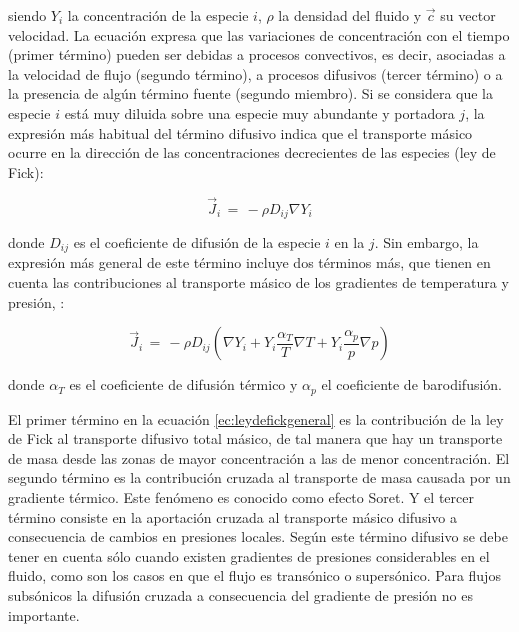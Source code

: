 siendo  $Y_i$ la concentración de la especie $i$,  $\rho$ la densidad del fluido y  $\vec{c}$ su vector velocidad. La ecuación expresa que las variaciones de concentración con el tiempo (primer término) pueden ser debidas a procesos convectivos, es decir, asociadas a la velocidad de flujo (segundo término), a procesos difusivos (tercer término) o a la presencia de algún término fuente (segundo miembro). Si se considera que la especie $i$ está muy diluida sobre una especie muy abundante y portadora $j$, la expresión más habitual del término difusivo indica que el transporte másico ocurre en la dirección de las concentraciones decrecientes de las especies (ley de Fick):

\begin{equation}
\label{ec:leydefick}
\vec{J}_i\,=\,-\rho D_{ij} \nabla Y_i
\end{equation}

donde  $D_{ij}$ es el coeficiente de difusión de la especie $i$ en la $j$. Sin embargo, la expresión más general de este término incluye dos términos más, que tienen en cuenta las contribuciones al transporte másico de los gradientes de temperatura y presión, \cite{landauetal:1987}:

\begin{equation}
\label{ec:leydefickgeneral}
\vec{J}_i\,=\,- \rho D_{ij} \left( \nabla Y_i + Y_i \frac{\alpha_T}{T} \nabla T + Y_i \frac{\alpha_p}{p} \nabla p \right)
\end{equation}

donde  $\alpha_T$ es el  coeficiente de difusión térmico y  $\alpha_p$ el  coeficiente de barodifusión.

\par El primer término en la ecuación \ref{ec:leydefickgeneral} es la contribución de la ley de Fick al transporte difusivo total másico, de tal manera que hay un transporte de masa desde las zonas de mayor concentración a las de menor concentración. El segundo término es la contribución cruzada al transporte de masa causada por un gradiente térmico. Este fenómeno es conocido como  efecto Soret. Y el tercer término consiste en la aportación cruzada al transporte másico difusivo a consecuencia de cambios en presiones locales. Según \cite{landauetal:1987} este término difusivo se debe tener en cuenta sólo cuando existen gradientes de presiones considerables en el fluido, como son los casos en que el flujo es transónico o supersónico. Para flujos subsónicos la difusión cruzada a consecuencia del gradiente de presión no es importante.


